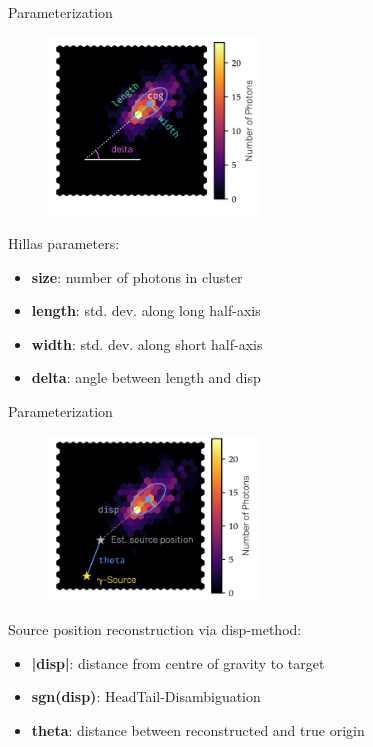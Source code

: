 \begin{frame}[t]{Parameterization}
    \begin{multicols}{2}
        \begin{figure}
            \centering
            \includegraphics[width=0.5\textwidth]{fig/hillas.png}
        \end{figure}
    \columnbreak
Hillas parameters:
    \begin{itemize}
        \item \textbf{{\color{tugreen} size}}: number of photons in cluster
        \item \textbf{{\color{tugreen} length}}: std. dev. along long half-axis
        \item \textbf{{\color{tugreen} width}}: std. dev. along short half-axis
        \item \textbf{{\color{tugreen} delta}}: angle between length and disp
    \end{itemize}
    \end{multicols}
\end{frame}

\begin{frame}[t]{Parameterization}
    \begin{multicols}{2}
        \begin{figure}
            \centering
            \includegraphics[width=0.5\textwidth]{fig/disp.png}
        \end{figure}
    \columnbreak
Source position reconstruction via disp-method:
    \begin{itemize}
        \item \textbf{{\color{tugreen} |disp|}}: distance from centre of gravity to target
        \item \textbf{{\color{tugreen} sgn(disp)}}: Head\/Tail-Disambiguation
        \item \textbf{{\color{tugreen} theta}}: distance between reconstructed and true origin
    \end{itemize}
    \end{multicols}
\end{frame}

